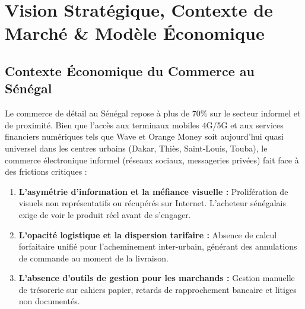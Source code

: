 \documentclass[11pt,a4paper,titlepage]{report}
\begin{document}
\chapter{Vision Stratégique, Contexte de Marché \& Modèle Économique}

\section{Contexte Économique du Commerce au Sénégal}
Le commerce de détail au Sénégal repose à plus de 70\% sur le secteur informel et de proximité. Bien que l'accès aux terminaux mobiles 4G/5G et aux services financiers numériques tels que Wave et Orange Money soit aujourd'hui quasi universel dans les centres urbains (Dakar, Thiès, Saint-Louis, Touba), le commerce électronique informel (réseaux sociaux, messageries privées) fait face à des frictions critiques :
\begin{enumerate}
    \item \textbf{L'asymétrie d'information et la méfiance visuelle :} Prolifération de visuels non représentatifs ou récupérés sur Internet. L'acheteur sénégalais exige de voir le produit réel avant de s'engager.
    \item \textbf{L'opacité logistique et la dispersion tarifaire :} Absence de calcul forfaitaire unifié pour l'acheminement inter-urbain, générant des annulations de commande au moment de la livraison.
    \item \textbf{L'absence d'outils de gestion pour les marchands :} Gestion manuelle de trésorerie sur cahiers papier, retards de rapprochement bancaire et litiges non documentés.
\end{enumerate}
\end{document}
